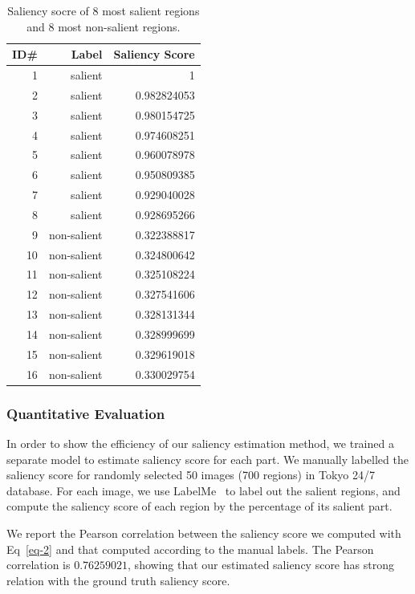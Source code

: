 \begin{table}[htbp]
\begin{tabular}{r|r|r}
ID\# & Label & Saliency Score \\
\hline \hline
1 & salient & 1 \\
2 & salient & 0.982824053 \\
3 & salient & 0.980154725 \\
4 & salient & 0.974608251 \\
5 & salient & 0.960078978 \\
6 & salient & 0.950809385 \\
7 & salient & 0.929040028 \\
8 & salient & 0.928695266 \\
9 & non-salient & 0.322388817 \\
10 & non-salient & 0.324800642 \\
11 & non-salient & 0.325108224 \\
12 & non-salient & 0.327541606 \\
13 & non-salient & 0.328131344 \\
14 & non-salient & 0.328999699 \\
15 & non-salient & 0.329619018 \\
16 & non-salient & 0.330029754
\end{tabular}
\caption{Saliency socre of 8 most salient regions and 8 most non-salient regions.}
\label{table:saliencyscore}
\end{table}

\subsubsection{Quantitative  Evaluation}
\par
In order to show the efficiency of our saliency estimation method, we trained a separate model to estimate saliency score for each part. We manually labelled the saliency score for randomly selected 50 images (700 regions) in Tokyo 24/7 database. For each image, we use LabelMe~\cite{Russell2008} to label out the salient regions, and compute the saliency score of each region by the percentage of its salient part. 
\par
We report the Pearson correlation between the saliency score we computed with Eq~\eqref{eq-2} and that computed according to the manual labels. The Pearson correlation is $0.76259021$, showing that our estimated saliency score has strong relation with the ground truth saliency score. 


